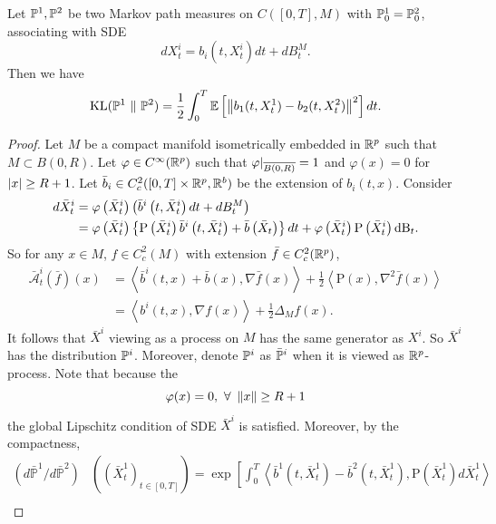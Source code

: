 \begin{cor}
    Let $\mathbb{P}^1,\mathbb{P}^2$ be two Markov path measures on $C([0,T],M)$ with $\mathbb{P}^1_0 = \mathbb{P}^2_0$, associating with SDE
    \begin{equation*}
        dX^i_t = b_i(t,X^i_t)dt + dB^M_t.
    \end{equation*}
    Then we have
    \begin{equation*}
        \operatorname{KL}(\mathbb{P}^1 ~\Vert~ \mathbb{P}^2) = \frac{1}{2}\int_0^T\mathbb{E}\left[\left\lVert b_1(t,X^1_t) - b_2(t,X^2_t)\right\lVert^2\right]dt.
    \end{equation*}
\end{cor}
\begin{proof}
    Let $M$ be a compact manifold isometrically embedded in $\mathbb{R}^p$ such that $M \subset B(0,R)$. Let $\varphi \in C^\infty(\mathbb{R}^p)$ such that $\varphi|_{\overline{B(0,R)}} = 1$ and $\varphi(x) = 0$ for $\left\lvert x\right\lvert \geq R+1$. Let $\bar{b}_i \in C_c^2([0,T] \times \mathbb{R}^p,\mathbb{R}^b)$ be the extension of $b_i(t,x)$. Consider
    \begin{align*}
        d \bar{X}_t^i&= \varphi\left(\bar{X}_t^i\right)\left(\bar{b}^i\left(t, \bar{X}_t^i\right)dt + dB^M_t\right) \\
        &=\varphi\left(\bar{X}_t^i\right)\left\{\mathrm{P}\left(\bar{X}_t^i\right) \bar{b}^i\left(t, \bar{X}_t^i\right)+\bar{b}\left(\bar{X}_t\right)\right\} d t+\varphi\left(\bar{X}_t^i\right) \mathrm{P}\left(\bar{X}_t^i\right) \mathrm{dB}_t.
    \end{align*}
    So for any $x \in M$, $f \in C^2_c(M)$ with extension $\bar{f} \in C_c^2(\mathbb{R}^p)$,
    \begin{align*}
        \bar{\mathcal{A}}_t^i(\bar{f})(x) & =\left\langle\bar{b}^i(t, x)+\bar{b}(x), \nabla \bar{f}(x)\right\rangle+\frac{1}{2}\left\langle\mathrm{P}(x), \nabla^2 \bar{f}(x)\right\rangle \\
        & =\left\langle b^i(t, x), \nabla f(x)\right\rangle+\frac{1}{2} \Delta_{M} f(x) .
    \end{align*}
    It follows that $\bar{X}^i$ viewing as a process on $M$ has the same generator as $X^i$. So $\bar{X}^i$ has the distribution $\mathbb{P}^i$. Moreover, denote $\mathbb{P}^i$ as $\bar{\mathbb{P}}^i$ when it is viewed as $\mathbb{R}^p$-process. Note that because the
    \begin{equation*}
        \varphi(x) = 0,~\forall~\left\lVert x\right\lVert \geq R+1
    \end{equation*}
    the global Lipschitz condition of SDE $\bar{X}^i$ is satisfied. Moreover, by the compactness,
    \begin{align*}
        \left(d \bar{\mathbb{P}}^1 / d \bar{\mathbb{P}}^2\right) & \left(\left(\bar{{X}}_t^1\right)_{t \in[0, T]}\right)=\exp \left[\int_0^T\left\langle\bar{b}^1\left(t, \bar{{X}}_t^1\right)-\bar{b}^2\left(t, \bar{{X}}_t^1\right), \mathrm{P}\left(\bar{{X}}_t^1\right) d \bar{{X}}_t^1\right\rangle\right. \\

\end{align*}
\end{proof}
